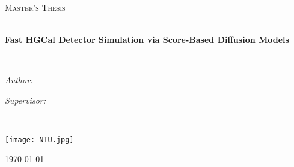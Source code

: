 \thispagestyle{empty}
~\\
\cleardoublepage


\thispagestyle{empty}

\begin{titlepage}
\begin{center}

\vspace*{.06\textheight}
{\scshape\LARGE \univname\par}\vspace{1.5cm} %
\textsc{\Large Master's Thesis}\\[0.5cm] %

\HRule \\[0.4cm] %
{\huge \bfseries {Fast HGCal Detector Simulation via Score-Based Diffusion Models} \par}\vspace{0.4cm} %
\HRule \\[1.5cm] %

\begin{minipage}[t]{0.4\textwidth}
\begin{flushleft} \Large
\emph{Author:}\\
\href{https://github.com/ChenHua-Hsu}{\authorname} %
\end{flushleft}

\end{minipage}
\begin{minipage}[t]{0.4\textwidth}
\begin{flushright} \Large
\emph{Supervisor:} \\
\href{https://www.phys.ntu.edu.tw/kfjack.html}{\supname} %
\end{flushright}
\end{minipage}\\[3cm]


\begin{center}
\texttt{[image: NTU.jpg]}
\end{center}

\vspace{1 cm}

{\Large \today}\\[4cm] %

\vfill

\end{center}
\end{titlepage}
\linespread{0}

